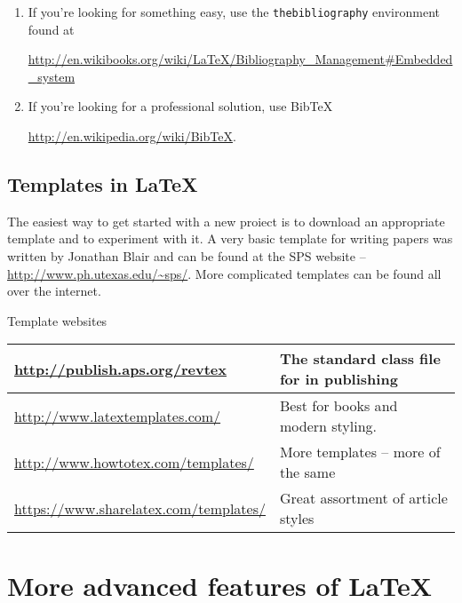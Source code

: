 \begin{enumerate}
\item If you're looking for something easy, use the \texttt{thebibliography} environment found at

 \url{http://en.wikibooks.org/wiki/LaTeX/Bibliography_Management#Embedded_system} 
\item If you're looking for a professional solution, use Bib\TeX\:

\url{http://en.wikipedia.org/wiki/BibTeX}.
\end{enumerate}

\section{Templates in \LaTeX\ }

The easiest way to get started with a new proiect is to download an appropriate template and to experiment with it. A very basic template for writing papers was written by Jonathan Blair and can be found at the SPS website -- \url{http://www.ph.utexas.edu/~sps/}. More complicated templates can be found all over the internet. 
\hfill \\
\begin{center}
\begin{flushright}
{\large \avantfont Template websites}\\
\end{flushright}

\begin{tabular}{|p{7cm} | p{8.5cm}| }
\hline
\hline
\url{http://publish.aps.org/revtex} & The standard class file for in publishing \\ \hline
\url{http://www.latextemplates.com/} & Best for books and modern styling. \\ \hline
\url{http://www.howtotex.com/templates/} & More templates -- more of the same \\ \hline
\url{https://www.sharelatex.com/templates/} & Great assortment of article styles\\ \hline

\end{tabular}
\end{center}


\chapter{ More advanced features of \LaTeX}
